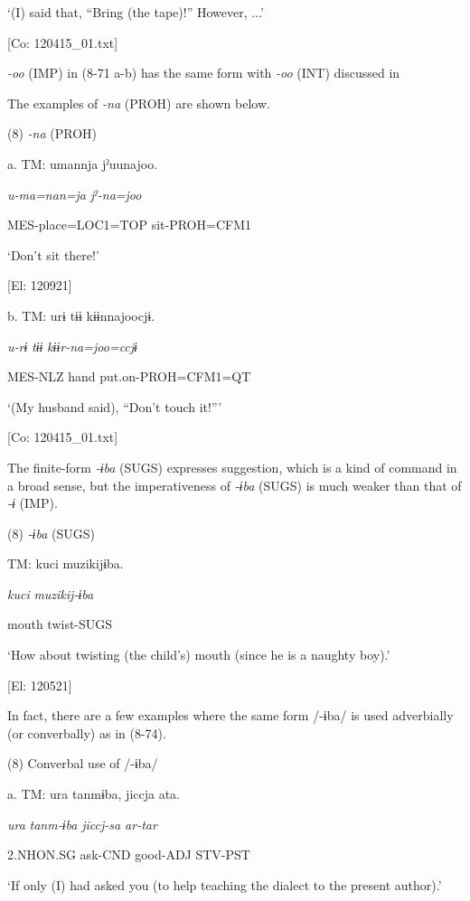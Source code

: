       ‘(I) said that, “Bring (the tape)!” However, ...’

      [Co: 120415\_01.txt]

\textit{{}-oo} (IMP) in (8-71 a-b) has the same form with \textit{-oo} (INT) discussed in 

  The examples of \textit{{}-na} (PROH) are shown below.

(8)  \textit{{}-na} (PROH)

  a.  TM:  umannja  jˀuunajoo.

      \textit{u-ma=nan=ja}  \textit{jˀ-na=joo}

      MES-place=LOC1=TOP  sit-PROH=CFM1

      ‘Don’t sit there!’

      [El: 120921]

  b.  TM:  urɨ  tɨɨ  kɨɨnnajoocjɨ.

      \textit{u-rɨ}  \textit{tɨɨ}  \textit{kɨɨr-na=joo=ccjɨ}

      MES-NLZ  hand  put.on-PROH=CFM1=QT

      ‘(My husband said), “Don’t touch it!”’

      [Co: 120415\_01.txt]

  The finite-form \textit{{}-ɨba} (SUGS) expresses suggestion, which is a kind of command in a broad sense, but the imperativeness of \textit{{}-ɨba} (SUGS) is much weaker than that of \textit{{}-ɨ} (IMP).

(8)  \textit{{}-ɨba} (SUGS)

  TM:  kuci  muzikijɨba.

    \textit{kuci}  \textit{muzikij-ɨba}

    mouth  twist-SUGS

    ‘How about twisting (the child’s) mouth (since he is a naughty boy).’

    [El: 120521]

In fact, there are a few examples where the same form /-ɨba/ is used adverbially (or converbally) as in (8-74).

(8)  Converbal use of /-ɨba/

  a.  TM:  ura  tanmɨba,  jiccja  ata.

      \textit{ura}  \textit{tanm-ɨba}  \textit{jiccj{}-sa  ar-tar}

      2.NHON.SG  ask-CND  good-ADJ  STV-PST

      ‘If only (I) had asked you (to help teaching the dialect to the present author).’

